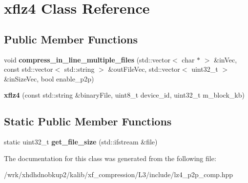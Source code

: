 \hypertarget{classxflz4}{\section{xflz4 Class Reference}
\label{classxflz4}
}
\subsection*{Public Member Functions}
\begin{DoxyCompactItemize}
\item 
\hypertarget{classxflz4_a9e27dafab06458253ea566cc183e5737}{void {\bfseries compress\-\_\-in\-\_\-line\-\_\-multiple\-\_\-files} (std\-::vector$<$ char $\ast$ $>$ \&in\-Vec, const std\-::vector$<$ std\-::string $>$ \&out\-File\-Vec, std\-::vector$<$ uint32\-\_\-t $>$ \&in\-Size\-Vec, bool enable\-\_\-p2p)}\label{classxflz4_a9e27dafab06458253ea566cc183e5737}

\item 
\hypertarget{classxflz4_a3e9f8190e723a3aa1f1316177f338370}{{\bfseries xflz4} (const std\-::string \&binary\-File, uint8\-\_\-t device\-\_\-id, uint32\-\_\-t m\-\_\-block\-\_\-kb)}\label{classxflz4_a3e9f8190e723a3aa1f1316177f338370}

\end{DoxyCompactItemize}
\subsection*{Static Public Member Functions}
\begin{DoxyCompactItemize}
\item 
\hypertarget{classxflz4_a8465dc5a5784b38586c66f78c3791d90}{static uint32\-\_\-t {\bfseries get\-\_\-file\-\_\-size} (std\-::ifstream \&file)}\label{classxflz4_a8465dc5a5784b38586c66f78c3791d90}

\end{DoxyCompactItemize}


The documentation for this class was generated from the following file\-:\begin{DoxyCompactItemize}
\item 
/wrk/xhdhdnobkup2/kalib/xf\-\_\-compression/\-L3/include/lz4\-\_\-p2p\-\_\-comp.\-hpp\end{DoxyCompactItemize}
